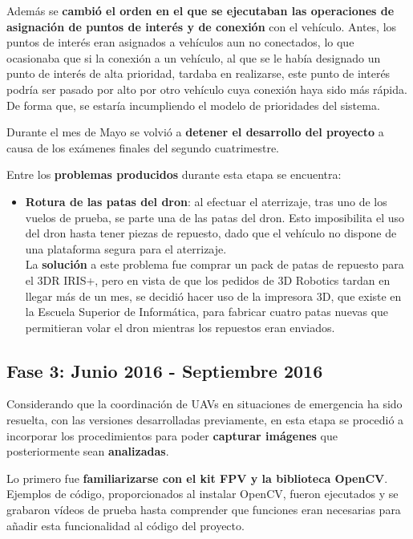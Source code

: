 Además se \textbf{cambió el orden en el que se ejecutaban las operaciones de asignación de puntos de interés y de conexión} con el vehículo. Antes, los puntos de interés eran asignados a vehículos aun no conectados, lo que ocasionaba que si la conexión a un vehículo, al que se le había designado un punto de interés de alta prioridad, tardaba en realizarse, este punto de interés podría ser pasado por alto por otro vehículo cuya conexión haya sido más rápida. De forma que, se estaría incumpliendo el modelo de prioridades del sistema.

Durante el mes de Mayo se volvió a \textbf{detener el desarrollo del proyecto} a causa de los exámenes finales del segundo cuatrimestre.

Entre los \textbf{problemas producidos} durante esta etapa se encuentra:
\begin{itemize}
\item \textbf{Rotura de las patas del dron}: al efectuar el aterrizaje, tras uno de los vuelos de prueba, se parte una de las patas del dron. Esto imposibilita el uso del dron hasta tener piezas de repuesto, dado que el vehículo no dispone de una plataforma segura para el aterrizaje. \\ La \textbf{solución} a este problema fue comprar un pack de patas de repuesto para el 3DR IRIS+, pero en vista de que los pedidos de 3D Robotics tardan en llegar más de un mes, se decidió hacer uso de la impresora 3D, que existe en la Escuela Superior de Informática, para fabricar cuatro patas nuevas que permitieran volar el dron mientras los repuestos eran enviados. 
\end{itemize}

\subsection{Fase 3: Junio 2016 - Septiembre 2016}
\label{sec:cuartaetapa}

Considerando que la coordinación de \acs{UAV}s en situaciones de emergencia ha sido resuelta, con las versiones desarrolladas previamente, en esta etapa se procedió a incorporar los procedimientos para poder \textbf{capturar imágenes} que posteriormente sean \textbf{analizadas}.

Lo primero fue \textbf{familiarizarse con el kit \acs{FPV} y la biblioteca OpenCV}. Ejemplos de código, proporcionados al instalar OpenCV, fueron ejecutados y se grabaron vídeos de prueba hasta comprender que funciones eran necesarias para añadir esta funcionalidad al código del proyecto.


